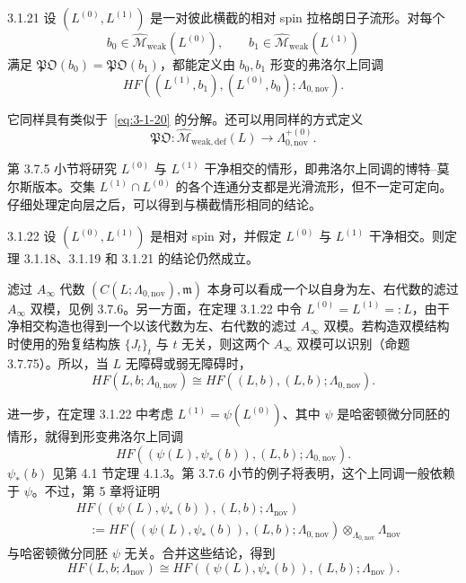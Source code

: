 \begin{theorem}{3.1.21}\label{thm:3-1-21}
设 $(L^{(0)},L^{(1)})$ 是一对彼此横截的相对 spin 拉格朗日子流形。对每个
\[
  b_0\in\widehat{\mathcal M}_{\mathrm{weak}}(L^{(0)}),
  \qquad
  b_1\in\widehat{\mathcal M}_{\mathrm{weak}}(L^{(1)})
\]
满足 $\mathfrak{PO}(b_0)=\mathfrak{PO}(b_1)$，都能定义由
$b_0,b_1$ 形变的弗洛尔上同调
\[
  HF((L^{(1)},b_1),(L^{(0)},b_0);\Lambda_{0,\mathrm{nov}}).
\]
\end{theorem}

它同样具有类似于~\eqref{eq:3-1-20} 的分解。还可以用同样的方式定义
\[
  \mathfrak{PO}\colon
  \widehat{\mathcal M}_{\mathrm{weak,def}}(L)
  \longrightarrow\Lambda_{0,\mathrm{nov}}^{+(0)}.
\]

第 3.7.5 小节将研究 $L^{(0)}$ 与 $L^{(1)}$ 干净相交的情形，即弗洛尔上同调的博特--莫尔斯版本。交集
$L^{(1)}\cap L^{(0)}$ 的各个连通分支都是光滑流形，但不一定可定向。仔细处理定向层之后，可以得到与横截情形相同的结论。

\begin{theorem}{3.1.22}\label{thm:3-1-22}
设 $(L^{(0)},L^{(1)})$ 是相对 spin 对，并假定 $L^{(0)}$ 与
$L^{(1)}$ 干净相交。则定理 3.1.18、3.1.19 和 3.1.21 的结论仍然成立。
\end{theorem}

滤过 $A_\infty$ 代数
$(C(L;\Lambda_{0,\mathrm{nov}}),\mathfrak m)$ 本身可以看成一个以自身为左、右代数的滤过
$A_\infty$ 双模，见例 3.7.6。另一方面，在定理 3.1.22 中令
$L^{(0)}=L^{(1)}=:L$，由干净相交构造也得到一个以该代数为左、右代数的滤过
$A_\infty$ 双模。若构造双模结构时使用的殆复结构族
$\{J_t\}_t$ 与 $t$ 无关，则这两个 $A_\infty$ 双模可以识别（命题 3.7.75）。所以，当 $L$ 无障碍或弱无障碍时，
\[
  HF(L,b;\Lambda_{0,\mathrm{nov}})
  \cong HF((L,b),(L,b);\Lambda_{0,\mathrm{nov}}).
\]

进一步，在定理 3.1.22 中考虑
$L^{(1)}=\psi(L^{(0)})$、其中 $\psi$ 是哈密顿微分同胚的情形，就得到形变弗洛尔上同调
\[
  HF((\psi(L),\psi_*(b)),(L,b);\Lambda_{0,\mathrm{nov}}).
\]
$\psi_*(b)$ 见第 4.1 节定理 4.1.3。第 3.7.6 小节的例子将表明，这个上同调一般依赖于 $\psi$。不过，第 5 章将证明
\[
\begin{split}
  &HF((\psi(L),\psi_*(b)),(L,b);\Lambda_{\mathrm{nov}})\\
  &\quad:=HF((\psi(L),\psi_*(b)),(L,b);\Lambda_{0,\mathrm{nov}})
  \otimes_{\Lambda_{0,\mathrm{nov}}}\Lambda_{\mathrm{nov}}
\end{split}
\]
与哈密顿微分同胚 $\psi$ 无关。合并这些结论，得到
\[
  HF(L,b;\Lambda_{\mathrm{nov}})
  \cong HF((\psi(L),\psi_*(b)),(L,b);\Lambda_{\mathrm{nov}}).
\]

